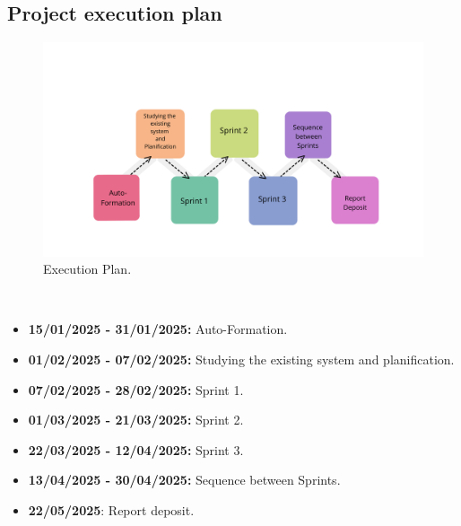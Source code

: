 \subsection{Project execution plan}
\begin{figure}[h]
    \centering
    \includegraphics[width=1\textwidth]{figures/sprintplan.png} 
    \caption{Execution Plan.}
\end{figure} \
\clearpage
\begin{itemize}
    \item \textbf{15/01/2025 - 31/01/2025:} Auto-Formation.
    \item \textbf{01/02/2025 - 07/02/2025:} Studying the existing system and planification.
    \item \textbf{07/02/2025 - 28/02/2025:} Sprint 1.
    \item \textbf{01/03/2025 - 21/03/2025:} Sprint 2.
    \item \textbf{22/03/2025 - 12/04/2025:} Sprint 3.
    \item \textbf{13/04/2025 - 30/04/2025:} Sequence between Sprints.
    \item \textbf{22/05/2025}: Report deposit.
\end{itemize}
\clearpage

